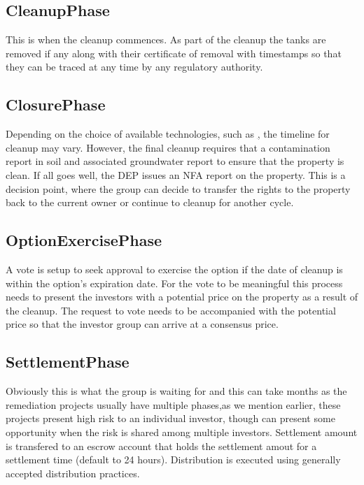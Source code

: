 \documentclass{article}
\begin{document}
  \subsection{CleanupPhase}
  This is when the cleanup commences. As part of the cleanup the tanks are removed if any along with their certificate of removal with timestamps so that they can be traced at any time by any regulatory authority. 

  \subsection{ClosurePhase}
  Depending on the choice of available technologies, such as \href{https://shop.sarvabioremed.com/collections/vaporremed}, the timeline for cleanup may vary. However, the final cleanup requires that a contamination report in soil and associated groundwater report to ensure that the property is clean. If all goes well, the DEP issues an NFA report on the property. This is a decision point, where the group can decide to transfer the rights to the property back to the current owner or continue to cleanup for another cycle. 

  \subsection{OptionExercisePhase}
  A vote is setup to seek approval to exercise the option if the date of cleanup is within the option's expiration date. For the vote to be meaningful this process needs to present the investors with a potential price on the property as a result of the cleanup. The request to vote needs to be accompanied with the potential price so that the investor group can arrive at a consensus price. 

  \subsection{SettlementPhase}
  Obviously this is what the group is waiting for and this can take months as the remediation projects usually have multiple phases,as we mention earlier, these projects present high risk to an individual investor, though can present some opportunity when the risk is shared among multiple investors. Settlement amount is transfered to an escrow account that holds the settlement amout for a settlement time (default to 24 hours). Distribution is executed using generally accepted distribution practices.
\end{document}
